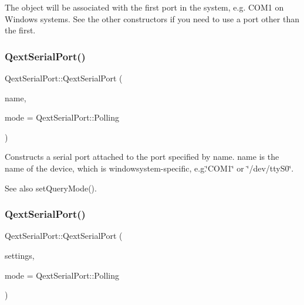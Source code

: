 The object will be associated with the first port in the system, e.\+g. C\+O\+M1 on Windows systems. See the other constructors if you need to use a port other than the first. \mbox{\label{class_qext_serial_port_ada4e210fc8b01ffee3f91847751a5e0f}} 
\subsubsection{\texorpdfstring{Qext\+Serial\+Port()}{QextSerialPort()}\hspace{0.1cm}{\footnotesize\ttfamily [2/5]}}
{\footnotesize\ttfamily Qext\+Serial\+Port\+::\+Qext\+Serial\+Port (\begin{DoxyParamCaption}\item[{const Q\+String \&}]{name,  }\item[{Query\+Mode}]{mode = {\ttfamily QextSerialPort\+:\+:Polling} }\end{DoxyParamCaption})}

Constructs a serial port attached to the port specified by name. name is the name of the device, which is windowsystem-\/specific, e.\+g.\char`\"{}\+C\+O\+M1\char`\"{} or \char`\"{}/dev/tty\+S0\char`\"{}.

\begin{DoxySeeAlso}{See also}
set\+Query\+Mode(). 
\end{DoxySeeAlso}
\mbox{\label{class_qext_serial_port_a08fc39acb695564a8672d544915ccccf}} 
\subsubsection{\texorpdfstring{Qext\+Serial\+Port()}{QextSerialPort()}\hspace{0.1cm}{\footnotesize\ttfamily [3/5]}}
{\footnotesize\ttfamily Qext\+Serial\+Port\+::\+Qext\+Serial\+Port (\begin{DoxyParamCaption}\item[{\mbox{\hyperlink{struct_port_settings}{Port\+Settings}} const \&}]{settings,  }\item[{Query\+Mode}]{mode = {\ttfamily QextSerialPort\+:\+:Polling} }\end{DoxyParamCaption})}

